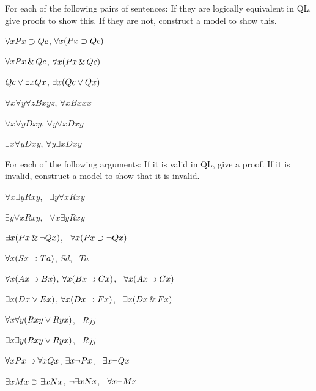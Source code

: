 \solutions
\problempart
\label{pr.QLequivornot}
For each of the following pairs of sentences: If they are logically equivalent in QL, give proofs to show this. If they are not, construct a model to show this.
\begin{earg}
\item $\forall x Px \supset Qc$, $\forall x (Px \supset Qc)$
\item $\forall x Px \,\&\, Qc$, $\forall x (Px \,\&\, Qc)$
\item $Qc \vee \exists x Qx$, $\exists x (Qc \vee Qx)$
\item $\forall x\forall y \forall z Bxyz$, $\forall x Bxxx$
\item $\forall x\forall y Dxy$, $\forall y\forall x Dxy$
\item $\exists x\forall y Dxy$, $\forall y\exists x Dxy$
\end{earg}

\solutions
\problempart
\label{pr.QLvalidornot}
For each of the following arguments: If it is valid in QL, give a proof. If it is invalid, construct a model to show that it is invalid.
\begin{earg}
\item $\forall x\exists y Rxy$, \therefore\ $\exists y\forall x Rxy$
\item $\exists y\forall x Rxy$, \therefore\ $\forall x\exists y Rxy$
\item $\exists x(Px \,\&\, \neg Qx)$, \therefore\ $\forall x(Px \supset \neg Qx)$
\item $\forall x(Sx \supset Ta)$, $Sd$, \therefore\ $Ta$
\item $\forall x(Ax\supset Bx)$, $\forall x(Bx \supset Cx)$, \therefore\ $\forall x(Ax \supset Cx)$
\item $\exists x(Dx \vee Ex)$, $\forall x(Dx \supset Fx)$, \therefore\ $\exists x(Dx \,\&\, Fx)$
\item $\forall x\forall y(Rxy \vee Ryx)$, \therefore\ $Rjj$
\item $\exists x\exists y(Rxy \vee Ryx)$, \therefore\ $Rjj$
\item $\forall x Px \supset \forall x Qx$, $\exists x \neg Px$, \therefore\ $\exists x \neg Qx$
\item $\exists x Mx \supset \exists x Nx$, $\neg \exists x Nx$, \therefore\ $\forall x \neg Mx$
\end{earg}

